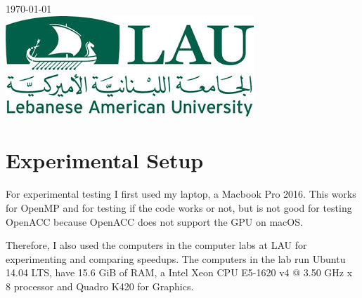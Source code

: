 \documentclass[12pt]{article}
\begin{document}
\begin{titlepage}


{\large \today}\\[2cm] %


\includegraphics[scale=0.5]{logo}\\[1cm] %
 

\vfill %

\end{titlepage}


\section{Experimental Setup}

For experimental testing I first used my laptop, a Macbook Pro 2016. This works
for OpenMP and for testing if the code works or not, but is not good for
testing OpenACC because OpenACC does not support the GPU on macOS.

Therefore, I also used the computers in the computer labs at LAU for
experimenting and comparing speedups. The computers in the lab run Ubuntu 14.04
LTS, have 15.6 GiB of RAM, a Intel Xeon CPU E5-1620 v4 @ 3.50 GHz x 8 processor
and Quadro K420 for Graphics.
\end{document}
